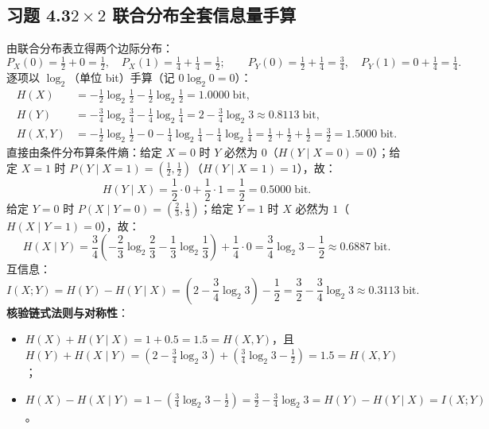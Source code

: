 \subsection*{习题 4.3\quad $2\times 2$ 联合分布全套信息量手算}
由联合分布表立得两个边际分布：
\[
  P_X(0) = \tfrac{1}{2} + 0 = \tfrac{1}{2},\quad P_X(1) = \tfrac{1}{4} + \tfrac{1}{4} = \tfrac{1}{2}; \qquad
  P_Y(0) = \tfrac{1}{2} + \tfrac{1}{4} = \tfrac{3}{4},\quad P_Y(1) = 0 + \tfrac{1}{4} = \tfrac{1}{4}.
\]
逐项以 $\log_2$（单位 bit）手算（记 $0\log_2 0 = 0$）：
\begin{align*}
  H(X) &= -\frac{1}{2}\log_2\frac{1}{2} - \frac{1}{2}\log_2\frac{1}{2} = \mathbf{1.0000}\;\text{bit}, \\
  H(Y) &= -\frac{3}{4}\log_2\frac{3}{4} - \frac{1}{4}\log_2\frac{1}{4}
        = 2 - \frac{3}{4}\log_2 3 \approx \mathbf{0.8113}\;\text{bit}, \\
  H(X, Y) &= -\frac{1}{2}\log_2\frac{1}{2} - 0 - \frac{1}{4}\log_2\frac{1}{4} - \frac{1}{4}\log_2\frac{1}{4}
           = \frac{1}{2} + \frac{1}{2} + \frac{1}{2} = \frac{3}{2} = \mathbf{1.5000}\;\text{bit}.
\end{align*}
直接由条件分布算条件熵：给定 $X=0$ 时 $Y$ 必然为 $0$（$H(Y\mid X=0)=0$）；给定 $X=1$ 时 $P(Y\mid X=1)=(\frac{1}{2}, \frac{1}{2})$（$H(Y\mid X=1)=1$），故：
\[
  H(Y \mid X) = \frac{1}{2}\cdot 0 + \frac{1}{2}\cdot 1 = \frac{1}{2} = \mathbf{0.5000}\;\text{bit}.
\]
给定 $Y=0$ 时 $P(X\mid Y=0)=(\frac{2}{3}, \frac{1}{3})$；给定 $Y=1$ 时 $X$ 必然为 $1$（$H(X\mid Y=1)=0$），故：
\[
  H(X \mid Y) = \frac{3}{4}\!\left(-\frac{2}{3}\log_2\frac{2}{3} - \frac{1}{3}\log_2\frac{1}{3}\right) + \frac{1}{4}\cdot 0
              = \frac{3}{4}\log_2 3 - \frac{1}{2} \approx \mathbf{0.6887}\;\text{bit}.
\]
互信息：
\[
  I(X; Y) = H(Y) - H(Y \mid X) = \left(2 - \frac{3}{4}\log_2 3\right) - \frac{1}{2}
          = \frac{3}{2} - \frac{3}{4}\log_2 3 \approx \mathbf{0.3113}\;\text{bit}.
\]
\textbf{核验链式法则与对称性}：
\begin{itemize}
  \item $H(X) + H(Y\mid X) = 1 + 0.5 = 1.5 = H(X, Y)$，且 $H(Y) + H(X\mid Y) = (2 - \frac{3}{4}\log_2 3) + (\frac{3}{4}\log_2 3 - \frac{1}{2}) = 1.5 = H(X, Y)$；
  \item $H(X) - H(X\mid Y) = 1 - (\frac{3}{4}\log_2 3 - \frac{1}{2}) = \frac{3}{2} - \frac{3}{4}\log_2 3 = H(Y) - H(Y\mid X) = I(X; Y)$。
\end{itemize}

